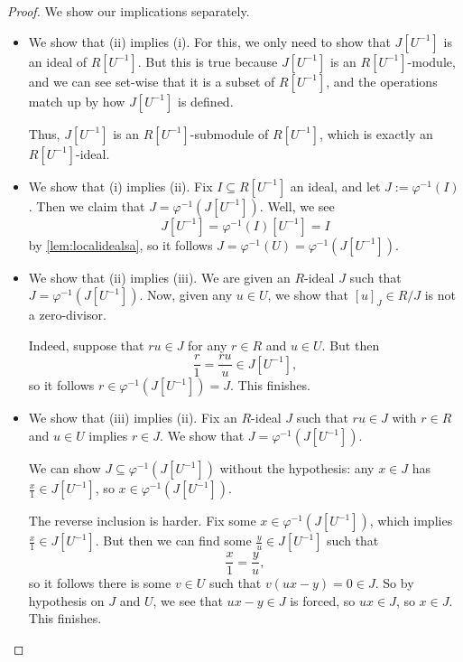 \begin{proof}
	We show our implications separately.
	\begin{itemize}
		\item We show that (ii) implies (i). For this, we only need to show that $J\left[U^{-1}\right]$ is an ideal of $R\left[U^{-1}\right]$. But this is true because $J\left[U^{-1}\right]$ is an $R\left[U^{-1}\right]$-module, and we can see set-wise that it is a subset of $R\left[U^{-1}\right]$, and the operations match up by how $J\left[U^{-1}\right]$ is defined.

		Thus, $J\left[U^{-1}\right]$ is an $R\left[U^{-1}\right]$-submodule of $R\left[U^{-1}\right]$, which is exactly an $R\left[U^{-1}\right]$-ideal.

		\item We show that (i) implies (ii). Fix $I\subseteq R\left[U^{-1}\right]$ an ideal, and let $J:=\varphi^{-1}(I)$. Then we claim that $J=\varphi^{-1}\left(J\left[U^{-1}\right]\right)$. Well, we see
		\[J\left[U^{-1}\right]=\varphi^{-1}(I)\left[U^{-1}\right]=I\]
		by \autoref{lem:localidealsa}, so it follows $J=\varphi^{-1}(U)=\varphi^{-1}\left(J\left[U^{-1}\right]\right)$.

		\item We show that (ii) implies (iii). We are given an $R$-ideal $J$ such that $J=\varphi^{-1}\left(J\left[U^{-1}\right]\right)$. Now, given any $u\in U$, we show that $[u]_J\in R/J$ is not a zero-divisor.
		
		Indeed, suppose that $ru\in J$ for any $r\in R$ and $u\in U$. But then
		\[\frac r1=\frac{ru}u\in J\left[U^{-1}\right],\]
		so it follows $r\in\varphi^{-1}\left(J\left[U^{-1}\right]\right)=J$. This finishes.

		\item We show that (iii) implies (ii). Fix an $R$-ideal $J$ such that $ru\in J$ with $r\in R$ and $u\in U$ implies $r\in J$. We show that $J=\varphi^{-1}\left(J\left[U^{-1}\right]\right)$.

		We can show $J\subseteq\varphi^{-1}\left(J\left[U^{-1}\right]\right)$ without the hypothesis: any $x\in J$ has $\frac x1\in J\left[U^{-1}\right]$, so $x\in\varphi^{-1}\left(J\left[U^{-1}\right]\right)$.

		The reverse inclusion is harder. Fix some $x\in\varphi^{-1}\left(J\left[U^{-1}\right]\right)$, which implies $\frac x1\in J\left[U^{-1}\right]$. But then we can find some $\frac yu\in J\left[U^{-1}\right]$ such that
		\[\frac x1=\frac yu,\]
		so it follows there is some $v\in U$ such that $v(ux-y)=0\in J$. So by hypothesis on $J$ and $U$, we see that $ux-y\in J$ is forced, so $ux\in J$, so $x\in J$. This finishes.
		\qedhere
	\end{itemize}
\end{proof}
